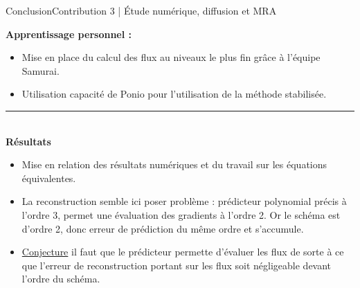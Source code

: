 \begin{frame}{Conclusion}{Contribution 3 | Étude numérique, diffusion et MRA}

    \textbf{Apprentissage personnel : }\\
    \begin{itemize}
        \item Mise en place du calcul des flux au niveaux le plus fin grâce à l'équipe Samurai.
        \item Utilisation capacité de Ponio pour l'utilisation de la méthode stabilisée. 
    \end{itemize}
    \noindent\color{Primary}\rule{\linewidth}{0.6pt}\color{black}\\
    \textbf{Résultats}\\
        \begin{itemize}
        \item Mise en relation des résultats numériques et du travail sur les équations équivalentes.
        \item La reconstruction semble ici poser problème : prédicteur polynomial précis à l'ordre 3, permet une évaluation des 
            gradients à l'ordre 2. Or le schéma est d'ordre 2, donc erreur de prédiction du même ordre et s'accumule.
        \item \underline{Conjecture} il faut que le prédicteur permette d'évaluer les flux de sorte à ce que 
        l'erreur de reconstruction portant sur les flux soit négligeable devant l'ordre du schéma. 
        \end{itemize}
\end{frame}